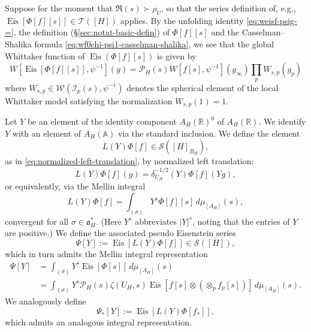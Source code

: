 \documentclass[reqno]{amsart}
\DeclareMathOperator{\Eis}{Eis}
\theoremstyle{plain} \newtheorem{theorem} {Theorem}
\theoremstyle{definition} \newtheorem{definition} [theorem] {Definition}
\theoremstyle{itplain} %
\numberwithin{equation}{section}
\numberwithin{theorem}{section}
\begin{document}
Suppose for the moment that $\Re(s) \succ \rho_U$, so that the series definition of, e.g., $\Eis[\Phi[f][s]] \in \mathcal{T}([H])$ applies.  By the unfolding identity \eqref{eq:weisf-psig-=}, the definition (\S\ref{sec:notat-basic-defin}) of $\Phi[f][s]$ and the Casselman--Shalika formula \eqref{eq:wf0chi-psi1-casselman-shalika}, we see that the global Whittaker function of $\Eis(\Phi[f][s])$ is given by
\begin{equation}\label{eq:weisphis-psi-1g}
  W[\Eis[\Phi[f][s]], \psi^{-1}](g)
  =
  \mathcal{P}_H(s)
  W[f[s], \psi^{-1}](g_\infty)
  \prod_p W_{s,p}(g_p)
\end{equation}
where $W_{s,p} \in \mathcal{W}(\mathcal{I}_p(s), \psi^{-1})$ denotes the spherical element of the local Whittaker model satisfying the normalization ${W}_{s,p}(1) = 1$.

Let $Y$ be an element of the identity component $A_H(\mathbb{R})^0$ of $A_H(\mathbb{R})$.  We identify $Y$ with an element of $A_H(\mathbb{A})$ via the standard inclusion.  We define the element
\begin{equation*}
L(Y) \Phi[f] \in \mathcal{S}([H]_{B_H}),
\end{equation*}
as in \eqref{eq:normalized-left-translation}, by normalized left translation:
\begin{equation}\label{eq:ly-phig-=}
  L(Y) \Phi[f](g) = \delta_{U_H}^{-1/2}(Y) \Phi[f](Y g),
\end{equation}
or equivalently, via the Mellin integral
\begin{equation*}
  L(Y) \Phi[f] = \int _{(\sigma)} Y^{s} \Phi[f][s] \, d \mu_{[A_H]}(s),
\end{equation*}
convergent for all $\sigma \in \mathfrak{a}_H^*$.  (Here $Y^s$ abbreviates $|Y|^s$, noting that the entries of $Y$ are positive.)  We define the associated pseudo Eisenstein series 
\begin{equation*}
  \Psi[Y] := \Eis[L(Y) \Phi[f]] \in \mathcal{S}([H]),
\end{equation*}
which in turn admits the Mellin integral representation
\begin{align*}
  \Psi[Y] &=
               \int _{(\sigma)} Y^{s}
               \Eis[\Phi[s]]
               \, d \mu_{[A_H]}(s) \\
  &=
  \int _{(\sigma)}
  Y^{s} \mathcal{P}_H(s) \zeta(U_H,s)
  \Eis[f[s] \otimes (\otimes_{p} f_p[s])] \, d \mu_{[A_H]}(s).
\end{align*}
We analogously define
\begin{equation*}
\Psi_{\ast}[Y] := \Eis[L(Y) \Phi[f_{\ast}]],
\end{equation*}
which admits an analogous integral representation.
\end{document}
